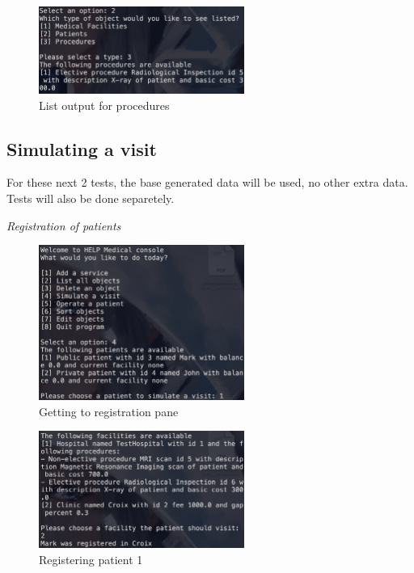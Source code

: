 \documentclass{article}
\begin{document}
	\begin{figure}
		\begin{center}
			\includegraphics[width=0.6\textwidth]{figures/Deleting/After_deletion_list_03.png}
		\end{center}
		\caption{List output for procedures}\label{fig:after_deletion_03}
	\end{figure}

  \pagebreak
  
	\subsection{Simulating a visit}\label{sub:simulating_a_visit} %
	For these next 2 tests, the base generated data will be used, no other extra data. Tests will also be done separetely.

	\textit{Registration of patients}
	\begin{figure}
		\begin{center}
			\includegraphics[width=0.6\textwidth]{figures/Visiting/Register_patients_01.png}
		\end{center}
		\caption{Getting to registration pane}\label{fig:register_patients_01}
	\end{figure}

	\begin{figure}
		\begin{center}
			\includegraphics[width=0.6\textwidth]{figures/Visiting/Register_patients_02.png}
		\end{center}
		\caption{Registering patient 1}\label{fig:register_patients_02}
	\end{figure}
	
\end{document}
